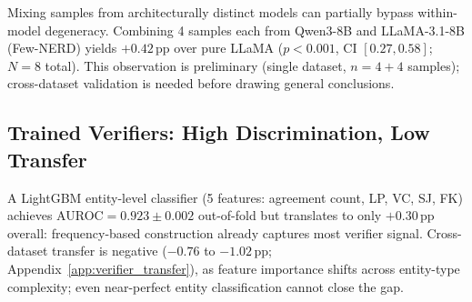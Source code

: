 Mixing samples from architecturally distinct models can partially bypass within-model degeneracy.
Combining 4 samples each from Qwen3-8B and LLaMA-3.1-8B (Few-NERD) yields $+0.42$\,pp over pure LLaMA ($p{<}0.001$, CI $[0.27, 0.58]$; $N{=}8$ total).
This observation is preliminary (single dataset, $n{=}4{+}4$ samples); cross-dataset validation is needed before drawing general conclusions.

\subsection{Trained Verifiers: High Discrimination, Low Transfer}\label{sec:verifier}

A LightGBM entity-level classifier (5 features: agreement count, LP, VC, SJ, FK) achieves AUROC${=}0.923{\pm}0.002$ out-of-fold but translates to only $+0.30$\,pp overall: frequency-based construction already captures most verifier signal.
Cross-dataset transfer is negative ($-0.76$ to $-1.02$\,pp; Appendix~\ref{app:verifier_transfer}), as feature importance shifts across entity-type complexity; even near-perfect entity classification cannot close the gap.

